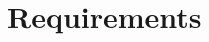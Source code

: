 \documentclass[12pt]{article}
\newcommand{\dref}[1]{GD\ref{#1}}
\newcommand{\ddref}[1]{DD\ref{#1}}
\newcommand{\aref}[1]{A\ref{#1}}
\newcommand{\iref}[1]{IM\ref{#1}}
\newcommand{\progname}{SWHS}
\begin{document}
%
%
%
%
%
%
%
%
%
%
%
%
%
%

\section{Requirements}
\end{document}
